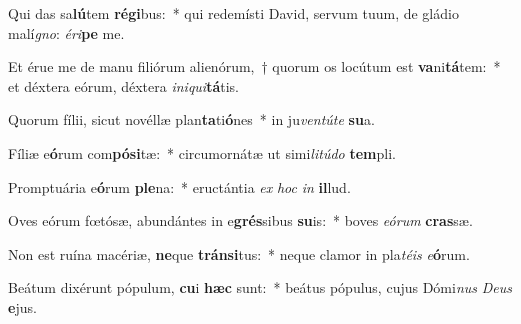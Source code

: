 \item Qui das sa\textbf{lú}tem \textbf{ré}\textbf{gi}bus:~* qui redemísti David, servum tuum, de gládio malí\textit{gno}: \textit{é}\textit{ri}\textbf{pe} me.
\item Et érue me de manu filiórum alienórum,~† quorum os locútum est \textbf{va}ni\textbf{tá}tem:~* et déxtera eórum, déxtera \textit{in}\textit{i}\textit{qui}\textbf{tá}tis.
\item Quorum fílii, sicut novéllæ plan\textbf{ta}ti\textbf{ó}nes~* in ju\textit{ven}\textit{tú}\textit{te} \textbf{su}a.
\item Fíliæ e\textbf{ó}rum com\textbf{pó}\textbf{si}tæ:~* circumornátæ ut simi\textit{li}\textit{tú}\textit{do} \textbf{tem}pli.
\item Promptuária e\textbf{ó}rum \textbf{ple}na:~* eructántia \textit{ex} \textit{hoc} \textit{in} \textbf{il}lud.
\item Oves eórum fœtósæ, abundántes in e\textbf{grés}sibus \textbf{su}is:~* boves \textit{e}\textit{ó}\textit{rum} \textbf{cras}sæ.
\item Non est ruína macériæ, \textbf{ne}que \textbf{tráns}\textbf{i}tus:~* neque clamor in pla\textit{té}\textit{is} \textit{e}\textbf{ó}rum.
\item Beátum dixérunt pópulum, \textbf{cu}i \textbf{hæc} sunt:~* beátus pópulus, cujus Dómi\textit{nus} \textit{De}\textit{us} \textbf{e}jus.
